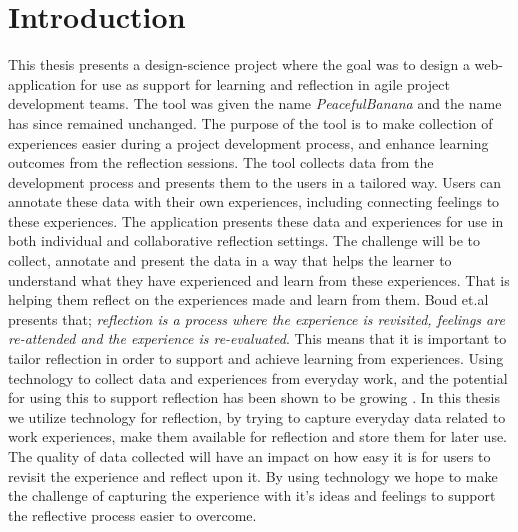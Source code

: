 \chapter{Introduction}
This thesis presents a design-science project where the goal was to design a web-application for use as support for learning and reflection in agile project development teams. The tool was given the name \emph{PeacefulBanana} and the name has since remained unchanged. The purpose of the tool is to make collection of experiences easier during a project development process, and enhance learning outcomes from the reflection sessions. 
The tool collects data from the development process and presents them to the users in a tailored way. Users can annotate these data with their own experiences, including connecting feelings to these experiences. The application presents these data and experiences for use in both individual and collaborative reflection settings. The challenge will be to collect, annotate and present the data in a way that helps the learner to understand what they have experienced and learn from these experiences. That is helping them reflect on the experiences made and learn from them. Boud et.al\citep{boudreflection1985} presents that; \emph{reflection is a process where the experience is revisited, feelings are re-attended and the experience is re-evaluated}. This means that it is important to tailor reflection in order to support and achieve learning from experiences. Using technology to collect data and experiences from everyday work, and the potential for using this to support reflection has been shown to be growing \citep{li2011understanding}. In this thesis we utilize technology for reflection, by trying to capture everyday data related to work experiences, make them available for reflection and store them for later use. The quality of data collected will have an impact on how easy it is for users to revisit the experience and reflect upon it. By using technology we hope to make the challenge of capturing the experience with it's ideas and feelings to support the reflective process easier to overcome. 


